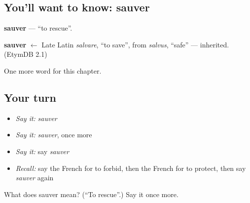 \subsection*{You'll want to know: sauver}
\textbf{sauver} — \textquotedblleft{}to rescue\textquotedblright{}.

\begin{cousinweb}
\textbf{sauver} $\leftarrow$ Late Latin \emph{salvare}, \textquotedblleft{}to save\textquotedblright{}, from \emph{salvus}, \textquotedblleft{}safe\textquotedblright{} — inherited. (EtymDB 2.1)
\end{cousinweb}

\begin{grammarlens}[title={What you've built}]
One more word for this chapter.
\end{grammarlens}

\subsection*{Your turn}
\begin{itemize}
\raggedright
  \item \emph{Say it:} \emph{sauver}
  \item \emph{Say it:} \emph{sauver}, once more
  \item \emph{Say it:} say \emph{sauver}
  \item \emph{Recall:} say the French for to forbid, then the French for to protect, then say \emph{sauver} again
\end{itemize}

\begin{tcolorbox}[breakable,colback=teal!4,colframe=teal!35!black,title={Before you move on}]
What does sauver mean? (\textquotedblleft{}To rescue\textquotedblright{}.) Say it once more.
\end{tcolorbox}
